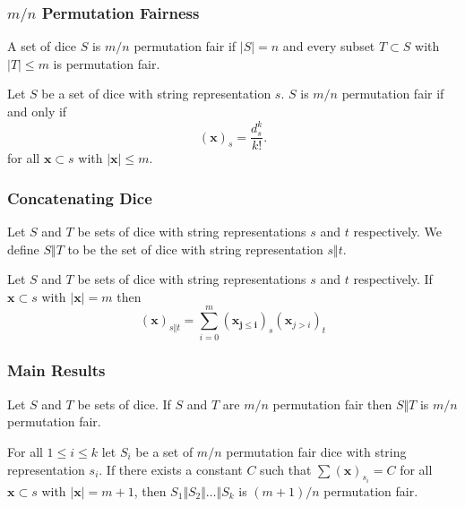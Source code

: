 \documentclass[aspectratio=169]{beamer}
\begin{document}
\begin{frame}[triangle=siiblue]
\frametitle{$m/n$ Permutation Fairness}
\begin{siidefinition}{}{}
	A set of dice $S$ is $m/n$ permutation fair if $|S| = n$ and every subset $T \subset S$ with $|T| \leq m$ is permutation fair.
\end{siidefinition}

\vfill

\begin{siilemma}[label=perm_fair_counts]{}{}
Let $S$ be a set of dice with string representation $s$.  $S$ is $m/n$ permutation fair if and only if
\begin{equation*}
(\mathbf{x})_s = \frac{d_s^k}{k!}.
\end{equation*}
for all $\mathbf{x} \subset s$ with $|\mathbf{x}| \leq m$.
\end{siilemma}
\end{frame}

\begin{frame}[triangle=siiblue]
\frametitle{Concatenating Dice}
\begin{siidefinition}{}{}
Let $S$ and $T$ be sets of dice with string representations $s$ and $t$ respectively.   We define $S \Vert T$ to be the set of dice with string representation $s \Vert t$. 
\end{siidefinition}

\begin{siilemma}[label=perm_fair_cat_counts]{}{}
Let $S$ and $T$ be sets of dice with string representations $s$ and $t$ respectively. If $\mathbf{x} \subset s$ with $|\mathbf{x}| = m$ then
\begin{equation*}
(\mathbf{x})_{s \Vert t} = \sum_{i=0}^{m} (\mathbf{x_{j \leq i}})_s (\mathbf{x}_{j > i})_t
\end{equation*}
\end{siilemma}

\end{frame}

\begin{frame}[triangle=siiblue]
\frametitle{Main Results}
\begin{siitheorem}[label=mn_perm_fair]{}{}
Let $S$ and $T$ be sets of dice. If $S$ and $T$ are $m/n$ permutation fair then $S \Vert T$ is $m/n$ permutation fair.
\end{siitheorem}

\begin{siitheorem}[label=lifting]{}{}
For all $1 \leq i \leq k$ let $S_i$ be a set of $m/n$ permutation fair dice with string representation $s_i$. If there exists a constant $C$ such that $\sum (\mathbf{x})_{s_i} = C$ for all $\mathbf{x} \subset s$ with $|\mathbf{x}| = m+1$, then $S_1 \Vert S_2 \Vert \ldots \Vert S_k$ is $(m+1)/n$ permutation fair.
\end{siitheorem}
\end{frame}
\end{document}
